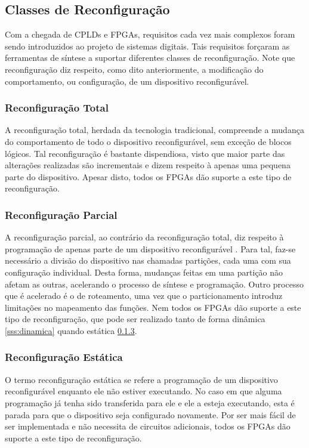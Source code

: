 \documentclass[11pt,a4paper,oneside]{book}
\begin{document}
\subsection{Classes de Reconfigura\c{c}\~ao}
Com a chegada de CPLDs e FPGAs, requisitos cada vez mais complexos foram sendo introduzidos ao projeto de sistemas digitais.
Tais requisitos for\c{c}aram as ferramentas de s\'i­ntese a suportar diferentes classes de reconfigura\c{c}\~ao.
Note que reconfigura\c{c}\~ao diz respeito, como dito anteriormente, a modifica\c{c}\~ao do comportamento, ou configura\c{c}\~ao, de um dispositivo reconfigur\'avel.

\subsubsection{Reconfigura\c{c}\~ao Total}
A reconfigura\c{c}\~ao total, herdada da tecnologia tradicional, compreende a mudan\c{c}a do comportamento de todo o dispositivo reconfigur\'avel, sem exce\c{c}\~ao de blocos l\'ogicos.
Tal reconfigura\c{c}\~ao \'e bastante dispendiosa, visto que maior parte das alterações realizadas são incrementais e dizem respeito \`a apenas uma pequena parte do dispositivo.
Apesar disto, todos os FPGAs d\~ao suporte a este tipo de reconfigura\c{c}\~ao.

\subsubsection{Reconfigura\c{c}\~ao Parcial}
A reconfigura\c{c}\~ao parcial, ao contr\'ario da reconfigura\c{c}\~ao total, diz respeito \`a programa\c{c}\~ao de apenas parte de um dispositivo reconfigur\'avel \cite{Hauck2007}.
Para tal, faz-se necess\'ario a divis\~ao do dispositivo nas chamadas parti\c{c}\~oes, cada uma com sua configura\c{c}\~ao individual.
Desta forma, mudan\c{c}as feitas em uma parti\c{c}\~ao n\~ao afetam as outras, acelerando o processo de s\'i­ntese e programa\c{c}\~ao.
Outro processo que \'e acelerado \'e o de roteamento, uma vez que o particionamento introduz limita\c{c}\~oes no mapeamento das fun\c{c}\~oes.
Nem todos os FPGAs d\~ao suporte a este tipo de reconfigura\c{c}\~ao, que pode ser realizado tanto de forma dinâmica \ref{sss:dinamica} quando estática \ref{sss:estatica}.


\subsubsection{Reconfigura\c{c}\~ao Est\'atica}
\label{sss:estatica}
O termo reconfigura\c{c}\~ao est\'atica se refere a programa\c{c}\~ao de um dispositivo reconfigur\'avel enquanto ele n\~ao estiver executando.
No caso em que alguma programa\c{c}\~ao j\'a tenha sido transferida para ele e ele a esteja executando, esta \'e parada para que o dispositivo seja configurado novamente.
Por ser mais f\'acil de ser implementada e n\~ao necessita de circuitos adicionais, todos os FPGAs d\~ao suporte a este tipo de reconfigura\c{c}\~ao.
\end{document}
